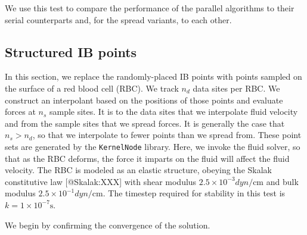 We use this test to compare the performance of the parallel algorithms to
their serial counterparts and, for the spread variants, to each other.





\subsection{Structured IB points}

In this section, we replace the randomly-placed IB points with points sampled
on the surface of a red blood cell (RBC). We track $n_d$ data sites per RBC.
We construct an interpolant based on the positions of those points and evaluate
forces at $n_s$ sample sites. It is to the data sites that we interpolate
fluid velocity and from the sample sites that we spread forces. It is generally
the case that $n_s > n_d$, so that we interpolate to fewer points than we
spread from. These point sets are generated by the \texttt{KernelNode} library.
Here, we invoke the fluid solver, so that as the RBC deforms, the force it
imparts on the fluid will affect the fluid velocity. The RBC is modeled as an
elastic structure, obeying the Skalak constitutive law [@Skalak:XXX] with shear
modulus $2.5\times10^{-3}\si{dyn\per\centi\meter}$ and bulk modulus
$2.5\times10^{-1}\si{dyn\per\centi\meter}$. The timestep required for stability
in this test is $k=1\times 10^{-7}\si{\second}$.

We begin by confirming the convergence of the solution.




